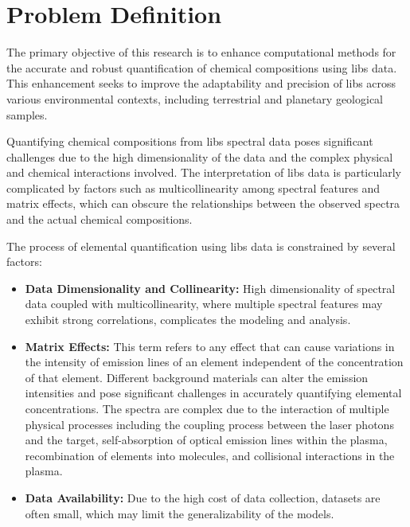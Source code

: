 \section{Problem Definition}\label{sec:problem_definition}
The primary objective of this research is to enhance computational methods for the accurate and robust quantification of chemical compositions using \gls{libs} data.
This enhancement seeks to improve the adaptability and precision of \gls{libs} across various environmental contexts, including terrestrial and planetary geological samples.

Quantifying chemical compositions from \gls{libs} spectral data poses significant challenges due to the high dimensionality of the data and the complex physical and chemical interactions involved. The interpretation of \gls{libs} data is particularly complicated by factors such as multicollinearity among spectral features and matrix effects, which can obscure the relationships between the observed spectra and the actual chemical compositions.

The process of elemental quantification using \gls{libs} data is constrained by several factors:
\begin{itemize}
    \item \textbf{Data Dimensionality and Collinearity:} High dimensionality of spectral data coupled with multicollinearity, where multiple spectral features may exhibit strong correlations, complicates the modeling and analysis\cite{andersonImprovedAccuracyQuantitative2017}.
    \item \textbf{Matrix Effects:} This term refers to any effect that can cause variations in the intensity of emission lines of an element independent of the concentration of that element. Different background materials can alter the emission intensities and pose significant challenges in accurately quantifying elemental concentrations. The spectra are complex due to the interaction of multiple physical processes including the coupling process between the laser photons and the target, self-absorption of optical emission lines within the plasma, recombination of elements into molecules, and collisional interactions in the plasma\cite{cleggRecalibrationMarsScience2017, andersonImprovedAccuracyQuantitative2017}.
    \item \textbf{Data Availability:} Due to the high cost of data collection, datasets are often small, which may limit the generalizability of the models\cite{p9_paper}.
\end{itemize}

